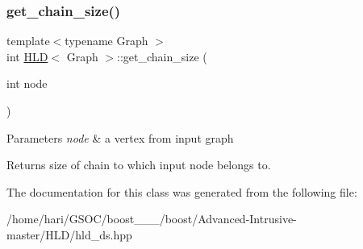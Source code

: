 \subsubsection{\texorpdfstring{get\+\_\+chain\+\_\+size()}{get\_chain\_size()}}
{\footnotesize\ttfamily template$<$typename Graph $>$ \\
int \hyperlink{classHLD}{H\+LD}$<$ Graph $>$\+::get\+\_\+chain\+\_\+size (\begin{DoxyParamCaption}\item[{int}]{node }\end{DoxyParamCaption})\hspace{0.3cm}{\ttfamily [inline]}}


\begin{DoxyParams}{Parameters}
{\em node} & a vertex from input graph \\
\hline
\end{DoxyParams}
\begin{DoxyReturn}{Returns}
size of chain to which input node belongs to. 
\end{DoxyReturn}


The documentation for this class was generated from the following file\+:\begin{DoxyCompactItemize}
\item 
/home/hari/\+G\+S\+O\+C/boost\+\_\+\_\+\_/boost/\+Advanced-\/\+Intrusive-\/master/\+H\+L\+D/hld\+\_\+ds.\+hpp\end{DoxyCompactItemize}
